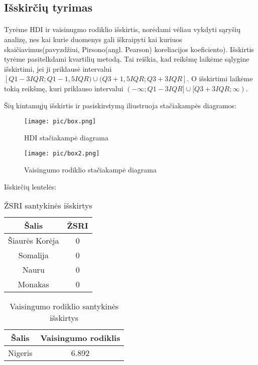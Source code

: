\subsection{Išskirčių tyrimas}
\paragraph{} Tyrėme HDI ir vaisinugmo rodiklio išskirtis, norėdami vėliau vykdyti sąryšių analizę, nes kai kurie duomenys gali iškraipyti kai kuriuos skaičiavimus(pavyzdžiui, Pirsono(angl. Pearson) koreliacijos koeficiento). 
Išskirtis tyrėme pasitelkdami kvartilių metodą. Tai reiškia, kad reikšmę laikėme sąlygine išskirtimi, jei ji priklausė intervalui $[Q1-3IQR; Q1-1,5IQR) \cup (Q3+1,5IQR; Q3+3IQR]$. O išskirtimi laikėme tokią reikšmę, kuri priklauso intervalui $(-\infty; Q1-3IQR] \cup [Q3+3IQR; \infty)$. \\\par
Šių kintamųjų išskirtis ir pasiskirstymą iliustruoja stačiakampės diagramos:

\begin{multicols}{2}
    \begin{figure}[H]
        \centering
        \texttt{[image: pic/box.png]}
        \caption{HDI stačiakampė diagrama}
    \end{figure}
    \begin{figure}[H]
        \centering
        \texttt{[image: pic/box2.png]}
        \caption{Vaisingumo rodiklio stačiakampė diagrama}
    \end{figure}
\end{multicols}

Išskirčių lentelės:
\begin{table}[H]
\begin{center}
    \caption{ŽSRI santykinės išskirtys}
    \begin{tabular}{c c}
        \hline
        \textbf{Šalis} & \textbf{ŽSRI} \\\hline
        Šiaurės Korėja & 0 \\
        Somalija & 0 \\
        Nauru & 0 \\
        Monakas & 0 \\\hline
    \end{tabular}
\end{center}
\end{table}

\begin{table}[H]
\begin{center}
    \caption{Vaisingumo rodiklio santykinės išskirtys}
    \begin{tabular}{c c}
        \hline
        \textbf{Šalis} & \textbf{Vaisingumo rodiklis} \\\hline
        Nigeris & 6.892 \\\hline
    \end{tabular}
\end{center}
\end{table}

